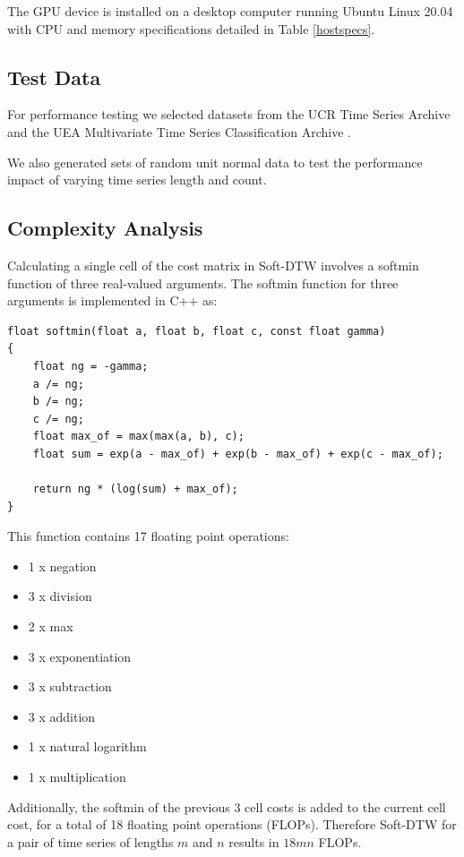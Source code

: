 \documentclass[12pt, letterpaper]{article}
\begin{document}
The GPU device is installed on a desktop computer running Ubuntu Linux 20.04
with CPU and memory specifications detailed in Table \ref{hostspecs}.

\subsection{Test Data}

For performance testing we selected datasets from the UCR Time Series Archive
\cite{dau_ucr_2019} and the UEA Multivariate Time Series Classification Archive
\cite{bagnall_uea_2018}.

We also generated sets of random unit normal data to test the performance impact
of varying time series length and count.

\subsection{Complexity Analysis}

Calculating a single cell of the cost matrix in Soft-DTW involves a softmin
function of three real-valued arguments. The softmin function for three
arguments is implemented in C++ as:

\begin{verbatim}
float softmin(float a, float b, float c, const float gamma)
{
    float ng = -gamma;
    a /= ng;
    b /= ng;
    c /= ng;
    float max_of = max(max(a, b), c);
    float sum = exp(a - max_of) + exp(b - max_of) + exp(c - max_of);

    return ng * (log(sum) + max_of);
}
\end{verbatim}

This function contains 17 floating point operations:

\begin{itemize}
  \item 1 x negation
  \item 3 x division
  \item 2 x max
  \item 3 x exponentiation
  \item 3 x subtraction
  \item 3 x addition
  \item 1 x natural logarithm
  \item 1 x multiplication
\end{itemize}

Additionally, the softmin of the previous 3 cell costs is added to the current
cell cost, for a total of 18 floating point operations (FLOPs). Therefore
Soft-DTW for a pair of time series of lengths $m$ and $n$ results in $18mn$
FLOPs.
\end{document}
